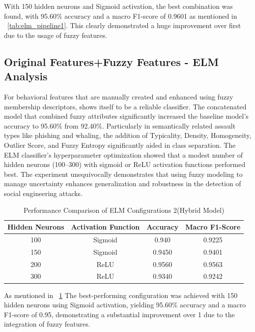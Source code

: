 With 150 hidden neurons and Sigmoid activation, the best combination was found, with 95.60\% accuracy and a macro F1-score of 0.9601 as mentioned in ~\ref{tab:elm_pipeline1}. This clearly demonstrated a huge improvement over first due to the usage of fuzzy features.

\subsection{Original Features+Fuzzy Features - ELM Analysis} 

For behavioral features that are manually created and enhanced using fuzzy membership descriptors, shows itself to be a reliable classifier. The concatenated model that combined fuzzy attributes significantly increased the baseline model's accuracy to 95.60\% from 92.40\%. Particularly in semantically related assault types like phishing and whaling, the addition of Typicality, Density, Homogeneity, Outlier Score, and Fuzzy Entropy significantly aided in class separation. The ELM classifier's hyperparameter optimization showed that a modest number of hidden neurons (100–300) with sigmoid or ReLU activation functions performed best. The experiment unequivocally demonstrates that using fuzzy modeling to manage uncertainty enhances generalization and robustness in the detection of social engineering attacks.
\begin{table}[h]
\centering
\caption{Performance Comparison of ELM Configurations 2(Hybrid Model)}
\label{tab:elm_pipeline2}
\begin{tabular}{|c|c|c|c|}
\hline
\textbf{Hidden Neurons} & \textbf{Activation Function} & \textbf{Accuracy} & \textbf{Macro F1-Score} \\ \hline
100 & Sigmoid & 0.940 & 0.9225 \\ \hline
150 & Sigmoid & 0.9450 & 0.9401 \\ \hline
200 & ReLU    & 0.9560 & 0.9563 \\ \hline
300 & ReLU    & 0.9340 & 0.9242 \\ \hline
\end{tabular}
\end{table}

As mentioned in ~\ref{tab:elm_pipeline2} The best-performing configuration was achieved with 150 hidden neurons using Sigmoid activation, yielding 95.60\% accuracy and a macro F1-score of 0.95, demonstrating a substantial improvement over 1 due to the integration of fuzzy features.

